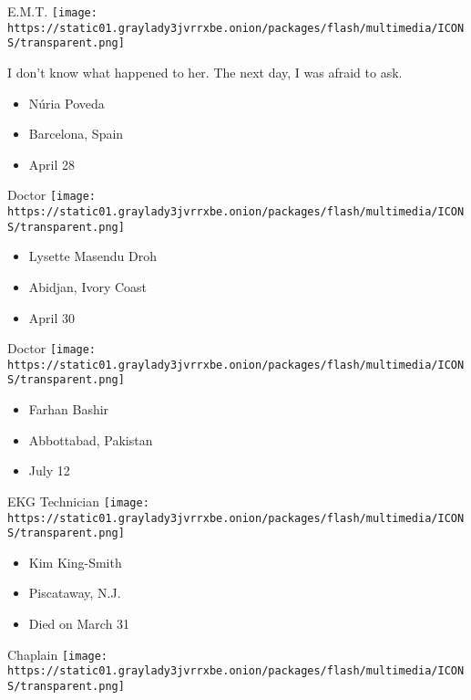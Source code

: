 E.M.T.
\texttt{[image: https://static01.graylady3jvrrxbe.onion/packages/flash/multimedia/ICONS/transparent.png]}

I don't know what happened to her. The next day, I was afraid to ask.

\begin{itemize}
\tightlist
\item
  Núria Poveda
\item
  Barcelona, Spain
\item
  April 28
\end{itemize}

\protect\hyperlink{item-lysette-masendu-droh}{}

Doctor
\texttt{[image: https://static01.graylady3jvrrxbe.onion/packages/flash/multimedia/ICONS/transparent.png]}

\begin{itemize}
\tightlist
\item
  Lysette Masendu Droh
\item
  Abidjan, Ivory Coast
\item
  April 30
\end{itemize}

\protect\hyperlink{item-farhan-bashir}{}

Doctor
\texttt{[image: https://static01.graylady3jvrrxbe.onion/packages/flash/multimedia/ICONS/transparent.png]}

\begin{itemize}
\tightlist
\item
  Farhan Bashir
\item
  Abbottabad, Pakistan
\item
  July 12
\end{itemize}

\protect\hyperlink{item-kim-king-smith}{}

EKG Technician
\texttt{[image: https://static01.graylady3jvrrxbe.onion/packages/flash/multimedia/ICONS/transparent.png]}

\begin{itemize}
\tightlist
\item
  Kim King-Smith
\item
  Piscataway, N.J.
\item
  Died on March 31
\end{itemize}

\protect\hyperlink{item-charles-huschle}{}

Chaplain
\texttt{[image: https://static01.graylady3jvrrxbe.onion/packages/flash/multimedia/ICONS/transparent.png]}

